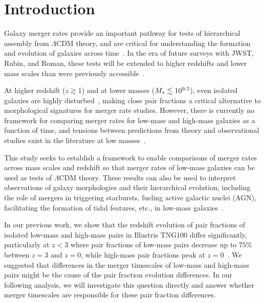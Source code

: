 \documentclass[twocolumn,linenumbers]{aastex631}
\begin{document}


\section{Introduction} \label{sec:intro}
Galaxy merger rates provide an important pathway for tests of hierarchical assembly from $\Lambda$CDM theory, and are critical for understanding the formation and evolution of galaxies across time~\citep[e.g.][]{Stewart2009, Hopkins2010b,RG2015}. 
In the era of future surveys with JWST, Rubin, and Roman, these tests will be extended to higher redshifts and lower mass scales than were previously accessible~\citep{Gardner2006,Spergel2015,Robertson2019a,Robertson2019b,Behroozi2020,Martin2022}.  

At higher redshift ($z\gtrsim1$) and at lower masses ($M_{*{}} \lesssim10^{9.5}$), even isolated galaxies are highly disturbed~\citep{Wuyts2012,Wuyts2013,Martin2018,RG2019,Martin2021}, making close pair fractions a critical alternative to morphological signatures for merger rate studies.
However, there is currently no framework for comparing merger rates for low-mass and high-mass galaxies as a function of time, and tensions between predictions from theory and observational studies exist in the literature at low masses~\citep[see e.g. Fig.~10 in][]{RG2015}. 

This study seeks to establish a framework to enable comparisons of merger rates across mass scales and redshift so that merger rates of low-mass galaxies can be used as tests of $\Lambda$CDM theory. 
These results can also be used to interpret observations of galaxy morphologies and their hierarchical evolution, including the role of mergers in triggering starbursts, fueling active galactic nuclei (AGN), facilitating the formation of tidal features, etc., in low-mass galaxies~\citep[e.g.][]{Stierwalt2015,Pearson2016,Privon2017,Kristensen2021,Martin2021,Luber2022,Martin2022,GuzmanOrtega2023,ByrneMamahit2024,KadoFong2024}. 

In our previous work, we show that the redshift evolution of pair fractions of isolated low-mass and high-mass pairs in Illustris TNG100 differ significantly, particularly at $z<3$ where pair fractions of low-mass pairs decrease up to $75\%$ between $z=3$ and $z=0$, while high-mass pair fractions peak at $z=0$~\citep{Chamberlain2024}. 
We suggested that differences in the merger timescales of low-mass and high-mass pairs might be the cause of the pair fraction evolution differences.
In our following analysis, we will investigate this question directly and answer whether merger timescales are responsible for these pair fraction differences.
\end{document}
